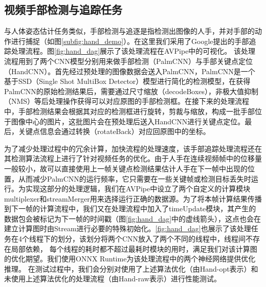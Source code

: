 \subsection{视频手部检测与追踪任务}
与人体姿态估计任务类似，手部检测与追逐是指检测出图像的人手，并对手部的动作进行捕捉（如图\ref{subfig:hand_demo}）。在这里我们采用了Google提出的手部追踪处理流程\cite{mediapipe_hand}。图\ref{fig:hand_dag}展示了该处理流程在AVPipe中的可视化。
该处理流程用到了两个CNN模型分别用来做手部检测（PalmCNN）与手部关键点定位（HandCNN）。首先经过预处理的图像数据会送入PalmCNN，PalmCNN是一个基于SSD（Single Shot MultiBox Detector）\cite{liu2016ssd}模型进行简化的检测模型，在获得PalmCNN的原始检测结果后，需要通过尺寸缩放（decodeBoxes），非极大值抑制（NMS）等后处理操作获得可以对应原图的手部检测框。在接下来的处理流程中，手部检测结果会根据其对应的检测框进行旋转，剪裁与缩放，构成一批手部位于图像中心的图片，这批图片会在预处理后送入HandCNN进行关键点定位。最后，关键点信息会通过转换（rotateBack）对应回原图中的坐标。\par
为了减少处理过程中的冗余计算，加快流程的处理速度，该手部追踪处理流程还在其检测算法流程上进行了针对视频任务的优化。由于人手在连续视频帧中的位移量一般较小，故可以直接使用上一帧关键点检测结果估计人手在下一帧中出现的位置，从而减少PalmCNN的运行频率，它只需要在一些关键帧或检测目标丢失时运行。为实现这部分的处理逻辑，我们在AVPipe中设立了两个自定义的计算模块multiplexer和streamMerger用来选择运行正确的数据源。为了将本帧计算结果传播到下一帧的计算流程中，我们又在处理流程中加入了timeUpdate模块，其产生的数据包会被标记为下一帧的时间戳（图\ref{fig:hand_dag}中的虚线箭头），这点也会在建立计算图时由Stream进行必要的特殊初始化。\ref{fig:hand_dag}也展示了该处理任务在4个线程下的划分，该划分将两个CNN放入了两个不同的线程中，线程间不存在局部依赖，
每个线程的耗时都不超过最耗时模块的用时，满足我们对该计算图的优化期望。我们使用ONNX Runtime为该处理流程中的两个神经网络提供优化推理。
在测试过程中，我们会分别对使用了上述算法优化（由Hand-opt表示）和未使用上述算法优化的处理流程（由Hand-raw表示）进行性能测试。

